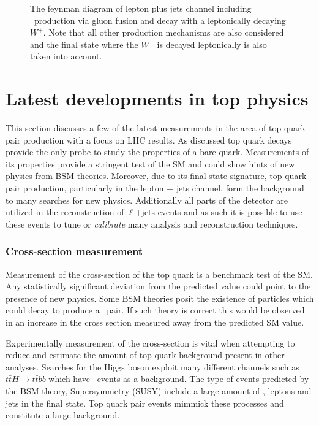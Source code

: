 \begin{figure}[htbp]
  \centering
  \begin{minipage}[][][t]{.60\textwidth}
  
  \end{minipage}
  \caption{The feynman diagram of lepton plus jets channel including \ttbar\ production via gluon fusion and decay with a leptonically decaying $W^+$. Note that all other production mechanisms are also considered and the final state where the $W^-$ is decayed leptonically is also taken into account.} \label{fig:TopQuarkFullLPlusJets}
\end{figure}

\section{Latest developments in top physics}

This section discusses a few of the latest measurements in the area of top quark pair production with a focus on LHC results. As discussed top quark decays provide the only probe to study the properties of a bare quark. Measurements of its properties provide a stringent test of the SM and could show hints of new physics from BSM theories. Moreover, due to its final state signature, top quark pair production, particularly in the lepton + jets channel, form the background to many searches for new physics. Additionally all parts of the detector are utilized in the reconstruction of $\ell$+jets events and as such it is possible to use these events to tune or \textit{calibrate} many analysis and reconstruction techniques.

\subsubsection{Cross-section measurement}

Measurement of the cross-section of the top quark is a benchmark test of the SM. Any statistically significant deviation from the predicted value could point to the presence of new physics. Some BSM theories posit the existence of particles which could decay to produce a \ttbar\ pair. If such theory is correct this would be observed in an increase in the cross section measured away from the predicted SM value.

Experimentally measurement of the cross-section is vital when attempting to reduce and estimate the amount of top quark background present in other analyses. Searches for the Higgs boson exploit many different channels such as $t\bar{t}H\rightarrow t\bar{t}b\bar{b}$ which have \ttbar\ events as a background. The type of events predicted by the BSM theory, Supersymmetry (SUSY) include a large amount of \met, leptons and jets in the final state. Top quark pair events mimmick these processes and constitute a large background.

